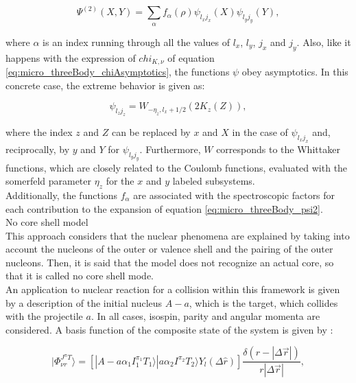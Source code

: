 \documentclass[openany]{book}
\begin{document}
\begin{equation}\label{eq:micro_threeBody_psi2}
	\Psi^{(2)}(X, Y) =  \sum_{\alpha} {f_\alpha (\rho) \psi_{l_xj_x}(X) \psi_{l_yj_y}(Y) }, 
\end{equation}

where $\alpha$ is an index running through all the values of $l_x$, $l_y$, $j_x$ and $j_y$. Also, like it happens with the expression of $chi_{K, \nu}$ of equation  \ref{eq:micro_threeBody_chiAsymptotics}, the functions $\psi$ obey asymptotics. In this concrete case, the extreme behavior is given as: 

\begin{equation}\label{eq:micro_threeBody_psi2_asymptotic}
	\psi_{l_{z}j_{z}} = W_{-\eta_{z}, l_x + 1/2}(2K_{z}(Z)),
\end{equation}

where the index $z$ and $Z$ can be replaced by $x$ and $X$ in the case of $\psi_{l_{x}j_{x}}$ and, reciprocally, by $y$ and $Y$ for $\psi_{l_{y}j_{y}}$. Furthermore, $W$ corresponds to the Whittaker functions, which are closely related to the Coulomb functions, evaluated with the somerfeld parameter $\eta_{z}$ for the $x$ and $y$ labeled subsystems.\\

Additionally, the functions $f_\alpha$ are associated with the spectroscopic factors for each contribution to the expansion of equation \ref{eq:micro_threeBody_psi2}. \\

No core shell model 
\cite{barrett_navratil_vary_2013} \\

This approach considers that the nuclear phenomena are explained by taking into account the nucleons of the outer or valence shell and the pairing of the outer nucleons. Then, it is said that the model does not recognize an actual core, so that it is called no core shell mode. \\

An application to nuclear reaction for a collision within this framework is given by a description of the initial nucleus $A - a$, which is the target, which collides with the projectile $a$. In all cases, isospin, parity and angular momenta are considered. A basis function of the composite state of the system is given by \cite{barrett_navratil_vary_2013}:

\begin{equation}\label{eq:micro_noCoreShell_basis}
	 | \Phi^{J^{\pi} T}_{\nu r} \rangle  = \left [ |A -a \alpha_1 I^{\pi_1}_1 T_1 \rangle | a \alpha_2  I^{\pi_2} T_2 \rangle  Y_l (\Delta \hat r)\right] \frac{\delta(r - |\Delta \vec r|)}{r  |\Delta \vec r|}, 
\end{equation}
\end{document}
